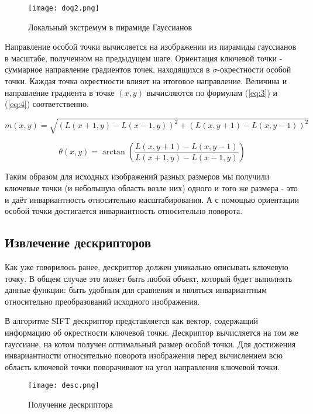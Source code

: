 \begin{figure}[h]
    \centering
    \texttt{[image: dog2.png]}
    \caption{Локальный экстремум в пирамиде Гауссианов}
    \label{fig:dog2}
\end{figure}

Направление особой точки вычисляется на изображении из пирамиды гауссианов в масштабе, полученном на предыдущем шаге. Ориентация ключевой точки - суммарное направление градиентов точек, находящихся в  $\sigma$-окрестности особой точки. Каждая точка окрестности влияет на итоговое направление. Величина и направление градиента в точке $(x,y)$ вычисляются по формулам (\ref{eq:3}) и (\ref{eq:4}) соответственно.

\begin{equation} \label{eq:3}
    m(x,y)=\sqrt{(L(x+1,y) - L(x-1,y))^2 + (L(x,y+1) - L(x,y-1))^2}
\end{equation}

\begin{equation} \label{eq:4}
    \theta(x,y)=\arctan{\left(\frac{L(x,y+1) - L(x,y-1)}{L(x+1,y) - L(x-1,y)}\right)}
\end{equation}

Таким образом для исходных изображений разных размеров мы получили ключевые точки (и небольшую область возле них) одного и того же размера - это и даёт инвариантность относительно масштабирования. А с помощью ориентации особой точки достигается инвариантность относительно поворота.

\subsection{Извлечение дескрипторов}

Как уже говорилось ранее, дескриптор должен уникально описывать ключевую точку. В общем случае это может быть любой объект, который будет выполнять данные функции: быть удобным для сравнения и являться инвариантным относительно преобразований исходного изображения.

В алгоритме SIFT дескриптор представляется как вектор, содержащий информацию об окрестности ключевой точки. Дескриптор вычисляется на том же гауссиане, на котом получен оптимальный размер особой точки. Для достижения инвариантности относительно поворота изображения перед вычислением всю область ключевой точки поворачивают на угол направления ключевой точки.

\begin{figure}[h]
    \centering
    \texttt{[image: desc.png]}
    \caption{Получение дескриптора}
    \label{fig:desc}
\end{figure}

